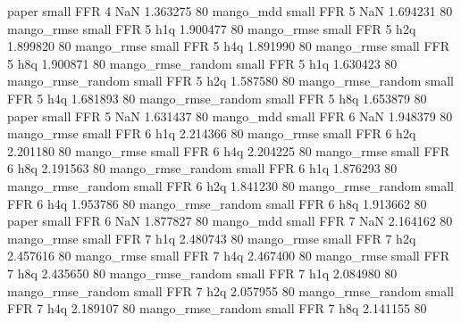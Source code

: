             paper      small      FFR                 4                  NaN 1.363275 80
        mango_mdd      small      FFR                 5                  NaN 1.694231 80
       mango_rmse      small      FFR                 5                  h1q 1.900477 80
       mango_rmse      small      FFR                 5                  h2q 1.899820 80
       mango_rmse      small      FFR                 5                  h4q 1.891990 80
       mango_rmse      small      FFR                 5                  h8q 1.900871 80
mango_rmse_random      small      FFR                 5                  h1q 1.630423 80
mango_rmse_random      small      FFR                 5                  h2q 1.587580 80
mango_rmse_random      small      FFR                 5                  h4q 1.681893 80
mango_rmse_random      small      FFR                 5                  h8q 1.653879 80
            paper      small      FFR                 5                  NaN 1.631437 80
        mango_mdd      small      FFR                 6                  NaN 1.948379 80
       mango_rmse      small      FFR                 6                  h1q 2.214366 80
       mango_rmse      small      FFR                 6                  h2q 2.201180 80
       mango_rmse      small      FFR                 6                  h4q 2.204225 80
       mango_rmse      small      FFR                 6                  h8q 2.191563 80
mango_rmse_random      small      FFR                 6                  h1q 1.876293 80
mango_rmse_random      small      FFR                 6                  h2q 1.841230 80
mango_rmse_random      small      FFR                 6                  h4q 1.953786 80
mango_rmse_random      small      FFR                 6                  h8q 1.913662 80
            paper      small      FFR                 6                  NaN 1.877827 80
        mango_mdd      small      FFR                 7                  NaN 2.164162 80
       mango_rmse      small      FFR                 7                  h1q 2.480743 80
       mango_rmse      small      FFR                 7                  h2q 2.457616 80
       mango_rmse      small      FFR                 7                  h4q 2.467400 80
       mango_rmse      small      FFR                 7                  h8q 2.435650 80
mango_rmse_random      small      FFR                 7                  h1q 2.084980 80
mango_rmse_random      small      FFR                 7                  h2q 2.057955 80
mango_rmse_random      small      FFR                 7                  h4q 2.189107 80
mango_rmse_random      small      FFR                 7                  h8q 2.141155 80
